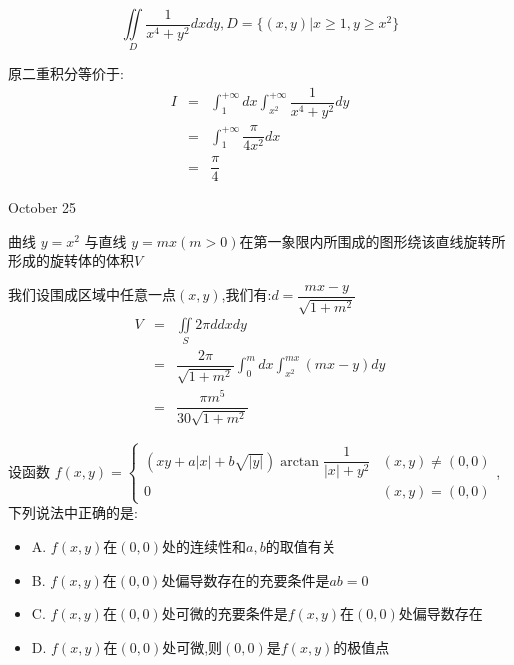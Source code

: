 \begin{example}[][Exam: 36.4.6]
	$$\iint\limits_{D}\dfrac{1}{x^4+y^2}dxdy, D=\{(x,y)|x\geq 1,y\geq x^2\}$$
\end{example}

\begin{solution}

	原二重积分等价于:
	\begin{eqnarray*}
		I&=&\int_{1}^{+\infty}dx\int_{x^2}^{+\infty}\dfrac{1}{x^4+y^2}dy\\
		&=&\int_{1}^{+\infty}\dfrac{\pi}{4x^2}dx\\
		&=&\dfrac{\pi}{4}
	\end{eqnarray*}
\end{solution}


\textcolor{purplea}{October 25}

\begin{example}[][Exam: 36.4.7]
	曲线 $y=x^2$ 与直线 $y=mx(m>0)$在第一象限内所围成的图形绕该直线旋转所形成的旋转体的体积$V$
\end{example}

\begin{solution}

	我们设围成区域中任意一点$(x,y)$,我们有:$d=\dfrac{mx-y}{\sqrt{1+m^2}}$
	\begin{eqnarray*}
		V&=&\iint\limits_{S}2\pi ddxdy\\
		&=&\dfrac{2\pi}{\sqrt{1+m^2}}\int_{0}^{m}dx\int_{x^2}^{mx}(mx-y)dy\\
		&=&\dfrac{\pi m^5}{30\sqrt{1+m^2}}
	\end{eqnarray*}
\end{solution}

\begin{example}[][Exam: 36.4.8]
	设函数 $f(x,y)=
	\begin{cases}
		(xy+a|x|+b\sqrt{|y|})\arctan \dfrac{1}{|x|+y^2} & (x,y)\neq (0,0)\\
		0 & (x,y)=(0,0)
	\end{cases}$,下列说法中正确的是:  
\begin{itemize}
	\item A. $f(x,y)$在$(0,0)$处的连续性和$a,b$的取值有关
	\item B. $f(x,y)$在$(0,0)$处偏导数存在的充要条件是$ab=0$
	\item C. $f(x,y)$在$(0,0)$处可微的充要条件是$f(x,y)$在$(0,0)$处偏导数存在
	\item D. $f(x,y)$在$(0,0)$处可微,则$(0,0)$是$f(x,y)$的极值点
\end{itemize}
\end{example}

